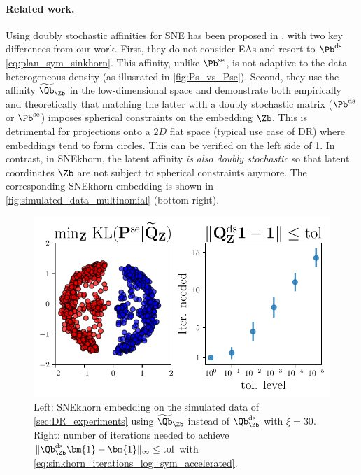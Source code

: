 \paragraph{Related work.}
    Using doubly stochastic affinities for SNE has been proposed in \citep{lu2019doubly}, with two key differences from our work. First, they
    do not consider EAs and resort to $\Pb^{\mathrm{ds}}$ \eqref{eq:plan_sym_sinkhorn}. This affinity, unlike $\Pb^{\mathrm{se}}$, is not adaptive to the data heterogeneous density (as illusrated in \cref{fig:Ps_vs_Pse}). 
    Second, they use the affinity $\widetilde{\Qb}_{\Zb}$ in the low-dimensional space and demonstrate both empirically and theoretically that matching the latter with a doubly stochastic matrix (\eg $\Pb^{\mathrm{ds}}$ or $\Pb^{\mathrm{se}}$) imposes spherical constraints on the embedding $\Zb$.
    This is detrimental for projections onto a $2D$ flat space (typical use case of DR) where embeddings tend to form circles. This can be verified on the left side of \cref{fig:snekhorn_not_DS}. In contrast, in SNEkhorn, the latent affinity \emph{is also doubly stochastic} so that latent coordinates $\Zb$ are not subject to spherical constraints anymore.
    The corresponding SNEkhorn embedding is shown in \cref{fig:simulated_data_multinomial} (bottom right).

\begin{figure}
    \centering
    \includegraphics[width=0.6\linewidth]{figures/SNEkhorn/snekhorn_not_DS.pdf}    
    \caption{Left: SNEkhorn embedding on the simulated data of \cref{sec:DR_experiments} using $\widetilde{\Qb}_{\Zb}$ instead of $\Qb^{\mathrm{ds}}_{\Zb}$ with $\xi=30$. Right: number of iterations needed to achieve $\| \Qb^{\mathrm{ds}}_{\Zb} \bm{1} - \bm{1} \|_{\infty} \leq \text{tol}$ with \eqref{eq:sinkhorn_iterations_log_sym_accelerated}.}
    \label{fig:snekhorn_not_DS}
\end{figure}
